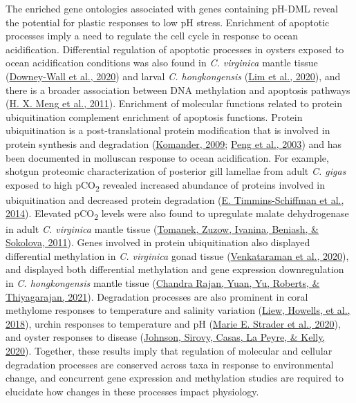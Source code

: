\documentclass [11pt, proquest] {uwthesis}[2015/03/03]
\begin{document}
The enriched gene ontologies associated with genes containing pH-DML reveal the potential for plastic responses to low pH stress. Enrichment of apoptotic processes imply a need to regulate the cell cycle in response to ocean acidification. Differential regulation of apoptotic processes in oysters exposed to ocean acidification conditions was also found in \emph{C. virginica} mantle tissue (\protect\hyperlink{ref-Downey-Wall2020}{Downey-Wall et al., 2020}) and larval \emph{C. hongkongensis} (\protect\hyperlink{ref-Lim2020}{Lim et al., 2020}), and there is a broader association between DNA methylation and apoptosis pathways (\protect\hyperlink{ref-Meng2011}{H. X. Meng et al., 2011}). Enrichment of molecular functions related to protein ubiquitination complement enrichment of apoptosis functions. Protein ubiquitination is a post-translational protein modification that is involved in protein synthesis and degradation (\protect\hyperlink{ref-Komander2009}{Komander, 2009}; \protect\hyperlink{ref-Peng2003}{Peng et al., 2003}) and has been documented in molluscan response to ocean acidification. For example, shotgun proteomic characterization of posterior gill lamellae from adult \emph{C. gigas} exposed to high pCO\textsubscript{2} revealed increased abundance of proteins involved in ubiquitination and decreased protein degradation (\protect\hyperlink{ref-Timmins-Schiffman2014}{E. Timmins-Schiffman et al., 2014}). Elevated pCO\textsubscript{2} levels were also found to upregulate malate dehydrogenase in adult \emph{C. virginica} mantle tissue (\protect\hyperlink{ref-Tomanek2011}{Tomanek, Zuzow, Ivanina, Beniash, \& Sokolova, 2011}). Genes involved in protein ubiquitination also displayed differential methylation in \emph{C. virginica} gonad tissue (\protect\hyperlink{ref-Venkataraman2020}{Venkataraman et al., 2020}), and displayed both differential methylation and gene expression downregulation in \emph{C. hongkongensis} mantle tissue (\protect\hyperlink{ref-ChandraRajan2021}{Chandra Rajan, Yuan, Yu, Roberts, \& Thiyagarajan, 2021}). Degradation processes are also prominent in coral methylome responses to temperature and salinity variation (\protect\hyperlink{ref-Liew2018a}{Liew, Howells, et al., 2018}), urchin responses to temperature and pH (\protect\hyperlink{ref-Strader2020}{Marie E. Strader et al., 2020}), and oyster responses to disease (\protect\hyperlink{ref-Johnson2020}{Johnson, Sirovy, Casas, La Peyre, \& Kelly, 2020}). Together, these results imply that regulation of molecular and cellular degradation processes are conserved across taxa in response to environmental change, and concurrent gene expression and methylation studies are required to elucidate how changes in these processes impact physiology.
\end{document}
